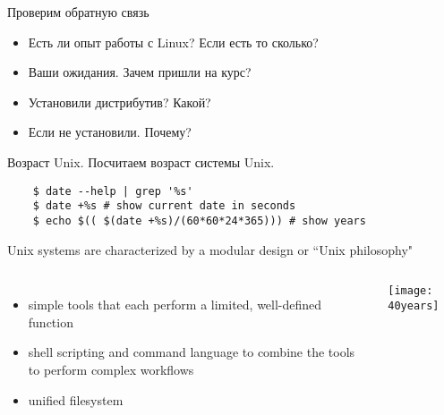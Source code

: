 \begin{frame}{Проверим обратную связь}
\begin{itemize}
    \item Есть ли опыт работы с Linux? Если есть то сколько?
    \pause
    \item Ваши ожидания. Зачем пришли на курс?
    \pause
    \item Установили дистрибутив? Какой?
    \item Если не установили. Почему?
\end{itemize}
\end{frame}

\begin{frame}[fragile]{Возраст Unix.}
 Посчитаем возраст системы Unix.
\begin{lstlisting}
    $ date --help | grep '%s'
    $ date +%s # show current date in seconds 
    $ echo $(( $(date +%s)/(60*60*24*365))) # show years
\end{lstlisting} 
\pause
Unix systems are characterized by a \alert{modular design} or ``Unix philosophy"
		\begin{columns}
\begin{itemize}
    \item simple tools that each perform a limited, well-defined function
    \item shell scripting and command language to combine the tools to perform complex workflows
    \item unified filesystem
\end{itemize}
            \texttt{[image: 40years]}
		\end{columns}
\end{frame}


